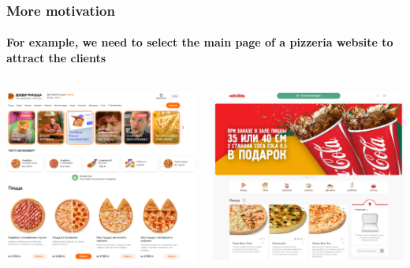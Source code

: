 \documentclass[fullscreen=true, bookmarks=true, hyperref={pdfencoding=unicode}]{beamer}
\begin{document}
\begin{frame}
  \frametitle{More motivation}
  \framesubtitle{For example, we need to select the main page of a pizzeria website to attract the clients}

  \begin{columns}
      \begin{column}{.5\paperwidth}
        \begin{center}
          \includegraphics[keepaspectratio,
                           height=.45\paperheight]{pizza-1.png}
        \end{center}
      \end{column}
      \begin{column}{.5\paperwidth}
        \begin{center}
          \includegraphics[keepaspectratio,
                           height=.4\paperwidth]{pizza-2.png}
        \end{center}
      \end{column}
  \end{columns}

\end{frame}
\end{document}
